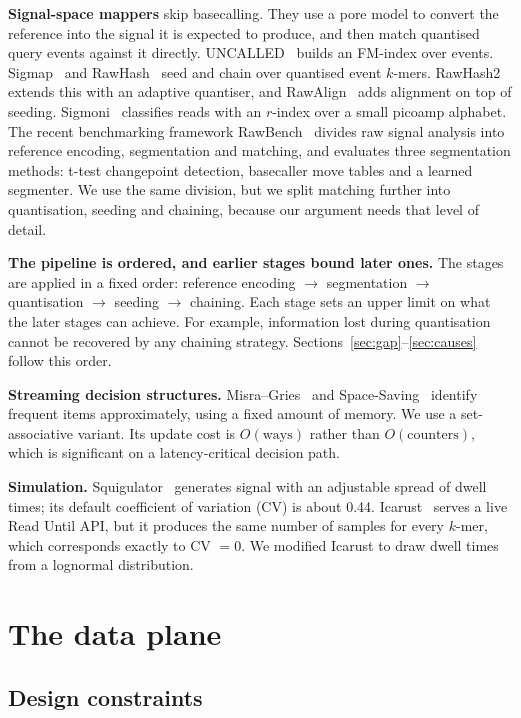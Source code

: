 \documentclass[conference]{IEEEtran}
\begin{document}
\textbf{Signal-space mappers} skip basecalling. They use a pore model to convert the reference
into the signal it is expected to produce, and then match quantised query events against it
directly. UNCALLED~\cite{uncalled} builds an FM-index over events. Sigmap~\cite{sigmap} and
RawHash~\cite{rawhash} seed and chain over quantised event $k$-mers. RawHash2~\cite{rawhash2}
extends this with an adaptive quantiser, and RawAlign~\cite{rawalign} adds alignment on top of
seeding. Sigmoni~\cite{sigmoni} classifies reads with an $r$-index over a small picoamp
alphabet. The recent benchmarking framework RawBench~\cite{rawbench} divides raw signal
analysis into reference encoding, segmentation and matching, and evaluates three segmentation
methods: t-test changepoint detection, basecaller move tables and a learned segmenter. We use
the same division, but we split matching further into quantisation, seeding and chaining,
because our argument needs that level of detail.

\textbf{The pipeline is ordered, and earlier stages bound later ones.} The stages are applied in
a fixed order: reference encoding $\rightarrow$ segmentation $\rightarrow$ quantisation
$\rightarrow$ seeding $\rightarrow$ chaining. Each stage sets an upper limit on what the later
stages can achieve. For example, information lost during quantisation cannot be recovered by any
chaining strategy. Sections~\ref{sec:gap}--\ref{sec:causes} follow this order.

\textbf{Streaming decision structures.} Misra--Gries~\cite{misragries} and
Space-Saving~\cite{spacesaving} identify frequent items approximately, using a fixed amount of
memory. We use a set-associative variant. Its update cost is $O(\text{ways})$ rather than
$O(\text{counters})$, which is significant on a latency-critical decision path.

\textbf{Simulation.} Squigulator~\cite{squigulator} generates signal with an adjustable spread
of dwell times; its default coefficient of variation (CV) is about 0.44. Icarust~\cite{icarust}
serves a live Read Until API, but it produces the same number of samples for every $k$-mer,
which corresponds exactly to CV $= 0$. We modified Icarust to draw dwell times from a lognormal
distribution.

\section{The data plane}
\label{sec:plane}

\subsection{Design constraints}
\end{document}
